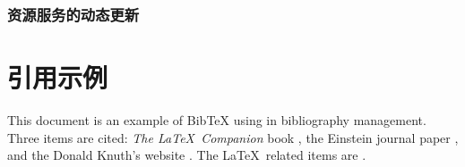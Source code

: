 \documentclass[a4paper, 12pt]{article}
\theoremstyle{definition}
\begin{document}
\subsubsection{资源服务的动态更新}

\newpage

\section{引用示例}
This document is an example of BibTeX using in bibliography management. Three items are cited: \textit{The \LaTeX\ Companion} book \cite{latexcompanion}, the Einstein journal paper \cite{einstein}, and the Donald Knuth's website \cite{knuthwebsite}. The \LaTeX\ related items are \cite{latexcompanion,knuthwebsite}. 

\newpage


\end{document}
